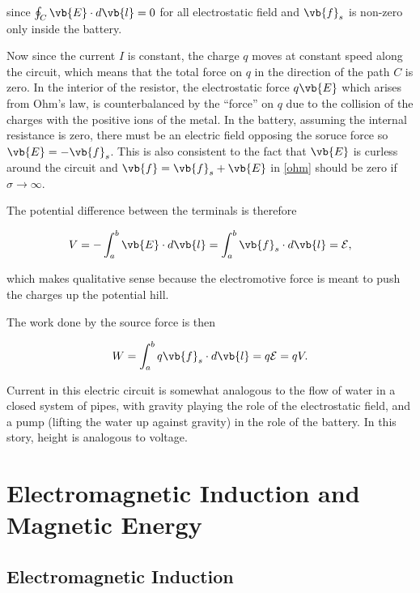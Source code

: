 \documentclass[english,a4paper,12pt]{report}
\begin{document}
since \(\oint_{C} \vb{E} \cdot d \vb{l} =0 \) for all electrostatic field and \(\vb{f} _{s} \) is non-zero only inside the battery. 

Now since the current \(I\) is constant, the charge \(q\) moves at constant speed along the circuit, which means that the total force on \(q\) in the direction of the path \(C\) is zero. In the interior of the resistor, the electrostatic force \( q\vb{E}  \) which arises from Ohm's law, is counterbalanced by the ``force'' on \(q\) due to the collision of the charges with the positive ions of the metal. In the battery, assuming the internal resistance is zero, there must be an electric field opposing the soruce force so \(\vb{E} = - \vb{f} _{s} \). This is also consistent to the fact that \(\vb{E} \) is curless around the circuit and \(\vb{f} = \vb{f} _{s} + \vb{E}  \) in \cref{ohm} should be zero if \(\sigma \rightarrow \infty\). 

The potential difference between the terminals is therefore 

\begin{equation}
    V = -\int_{a}^{b} \vb{E} \cdot d \vb{l} = \int_{a}^{b} \vb{f} _{s} \cdot d \vb{l} = \mathcal{E},
\end{equation}

which makes qualitative sense because the electromotive force is meant to push the charges up the potential hill.

The work done by the source force is then 

\begin{equation}
    W = \int_{a}^{b} q \vb{f} _{s} \cdot d \vb{l} = q \mathcal{E} = qV.
\end{equation}

Current in this electric circuit is somewhat analogous to the flow of water in a closed system of pipes, with gravity playing the role of the electrostatic field, and a pump (lifting the water up against gravity) in the role of the battery. In this story, height is analogous to voltage.

\section{Electromagnetic Induction and Magnetic Energy}

\subsection{Electromagnetic Induction}
\end{document}
